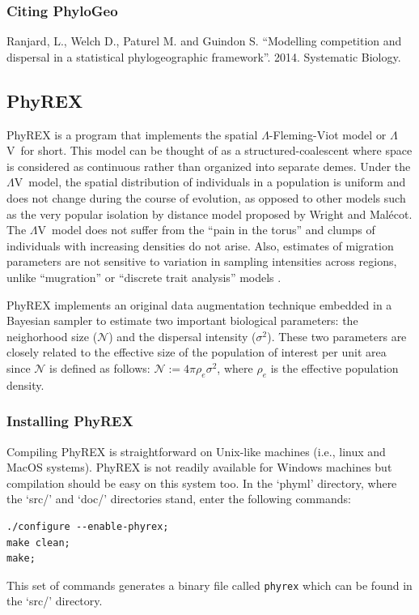 \documentclass[a4paper,12pt]{article}
\newcommand{\x}[1]{\texttt{#1}}
\newcommand{\sfv}{$\Lambda$V}
\begin{document}
\subsubsection{Citing PhyloGeo}\label{sec:citephylogeo}

Ranjard, L., Welch D., Paturel M. and Guindon S. ``Modelling competition  and  dispersal in a
statistical phylogeographic framework''. 2014. Systematic Biology.



\subsection{PhyREX} PhyREX is a program that implements the spatial
$\Lambda$-Fleming-Viot model
\cite{etheridge2008,berestycki2009,barton2010,barton2010b,veber2012,barton2013} or \sfv\ for short.
This model can be thought of as a structured-coalescent where space is considered as continuous
rather than organized into separate demes.
Under the \sfv\ model, the spatial distribution of individuals in a population is uniform and does
not change during the course of evolution, as opposed to other models such as the very popular
isolation by distance model proposed by Wright and Mal\'ecot. The \sfv\ model  does not
suffer from the ``pain in the torus'' \cite{felsenstein1975} and clumps of individuals with
increasing densities do not arise. Also, estimates of migration parameters are not sensitive to
variation in sampling intensities across regions, unlike ``mugration'' or ``discrete trait
analysis'' models \cite{lemey2009}.

PhyREX implements an original data augmentation technique embedded in a Bayesian sampler to
estimate two important biological parameters: the neighorhood size ($\mathcal{N}$) and the dispersal
intensity ($\sigma^2$). These two parameters are closely related to the effective size of the
population of interest per unit area since $\mathcal{N}$ is defined as follows: $\mathcal{N} := 4\pi
\rho_e \sigma^2$, where $\rho_e$ is the effective population density.

\subsubsection{Installing PhyREX}

Compiling PhyREX is straightforward on Unix-like  machines (i.e., linux and MacOS systems). PhyREX
is not readily available for Windows machines but  compilation should be easy on this system too. In
the `phyml' directory, where the `src/'  and `doc/' directories stand, enter the following commands:
{\setlength{\baselineskip}{0.5\baselineskip}
\begin{verbatim}
./configure --enable-phyrex;
make clean;
make;
\end{verbatim} } This set of commands generates  a binary file called \x{phyrex} which can be found
  in the `src/' directory.
\end{document}
